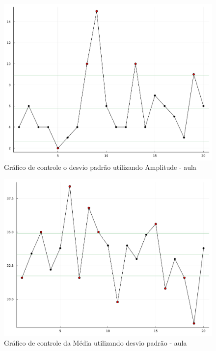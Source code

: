 \documentclass[
  letterpaper,
  DIV=11,
  numbers=noendperiod]{scrartcl}
\begin{document}
\begin{figure}

{\centering \includegraphics{trabalho1_files/figure-pdf/fig7-output-1.pdf}

}

\caption{Gráfico de controle o desvio padrão utilizando Amplitude -
aula}

\end{figure}

\begin{figure}

{\centering \includegraphics{trabalho1_files/figure-pdf/fig8-output-1.pdf}

}

\caption{Gráfico de controle da Média utilizando desvio padrão - aula}

\end{figure}
\end{document}
